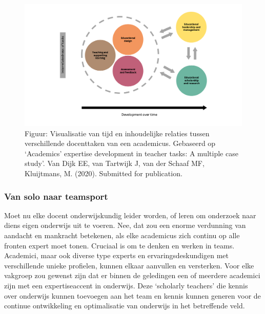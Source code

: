 \documentclass{jote-book}
\begin{document}
	\begin{figure}
		\includegraphics[width=\linewidth]{media/image7.png}



		\label{fig:rId23}



		\caption{Figuur: Visualisatie van tijd en inhoudelijke relaties tussen verschillende docenttaken van een academicus. Gebaseerd op ‘Academics' expertise development in teacher tasks: A multiple case study'. Van Dijk EE, van Tartwijk J, van der Schaaf MF, Kluijtmans, M. (2020). Submitted for publication.}
	\end{figure}



	\subsubsection{Van solo naar teamsport}



	Moet nu elke docent onderwijskundig leider worden, of leren om onderzoek naar diens eigen onderwijs uit te voeren. Nee, dat zou een enorme verdunning van aandacht en mankracht betekenen, als elke academicus zich continu op alle fronten expert moet tonen. Cruciaal is om te denken en werken in teams. Academici, maar ook diverse type experts en ervaringsdeskundigen met verschillende unieke profielen, kunnen elkaar aanvullen en versterken. Voor elke vakgroep zou gewenst zijn dat er binnen de geledingen een of meerdere academici zijn met een expertiseaccent in onderwijs. Deze ‘scholarly teachers' die kennis over onderwijs kunnen toevoegen aan het team en kennis kunnen generen voor de continue ontwikkeling en optimalisatie van onderwijs in het betreffende veld.
\end{document}
